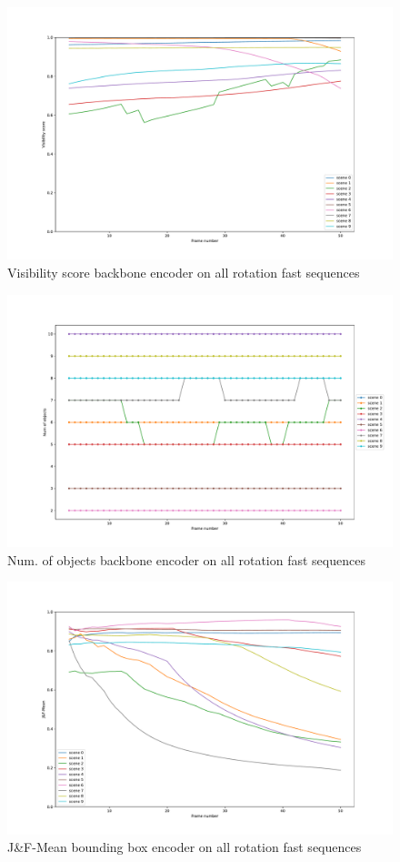 \begin{figure} [ht!]
    \centering
    \includegraphics[trim={ 0 2cm 0 2.5cm},width=0.6\linewidth]{figures/appendix/9_backbone_att_fpn_fast_rotation-visibility.pdf}
    \caption{Visibility score backbone encoder on all rotation fast sequences}
    \label{fig:backbone_visibility}
    
\end{figure}
\begin{figure} [ht!]
    \centering
    \includegraphics[trim={ 0 2cm 0 2.5cm},width=0.6\linewidth]{figures/appendix/9_backbone_att_fpn_fast_rotation-crowdness.pdf}
    \caption{Num. of objects backbone encoder on all rotation fast sequences}
    \label{fig:backbone_crowdness}
    
\end{figure}
\begin{figure} [ht!]
    \centering
    \includegraphics[trim={ 0 2cm 0 1.75cm},width=0.6\linewidth]{figures/appendix/5_bbox_att_fpn_fast_rotation-J_F.pdf}
    \caption{J\&F-Mean bounding box encoder on all rotation fast sequences}
    \label{fig:bbox_j_f}
    
\end{figure}

